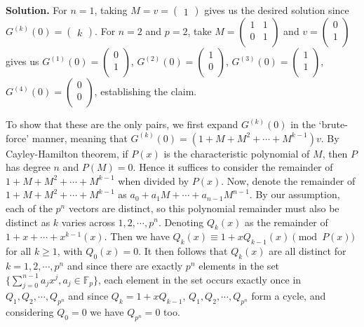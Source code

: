 \documentclass[11pt,a4paper]{article}
\newcommand{\bbF}{\mathbb F}
\newcommand{\<}{\langle}
\renewcommand{\>}{\rangle}
\begin{document}
\begin{enumerate}
	\textbf{Solution.} For $n=1$, taking $M=v=
	\begin{pmatrix}
	1
	\end{pmatrix}
	$ gives us the desired solution since $G^{(k)}(0)=
	\begin{pmatrix}
	k
	\end{pmatrix}
	$. For $n=2$ and $p=2$, take $M=
	\begin{pmatrix}
	1 & 1\\
	0 & 1\\
	\end{pmatrix}
	$ and $v=
	\begin{pmatrix}
	0\\
	1\\
	\end{pmatrix}
	$ gives us
	$G^{(1)}(0)=
	\begin{pmatrix}
	0\\
	1\\
	\end{pmatrix}
	$, 
	$G^{(2)}(0)=
	\begin{pmatrix}
	1\\
	0\\
	\end{pmatrix}
	$,
	$G^{(3)}(0)=
	\begin{pmatrix}
	1\\
	1\\
	\end{pmatrix}
	$,
	$G^{(4)}(0)=
	\begin{pmatrix}
	0\\
	0\\
	\end{pmatrix}
	$, establishing the claim. 
	
	To show that these are the only pairs, we first expand $G^{(k)}(0)$ in the `brute-force' manner, meaning that $G^{(k)}(0)=(1+M+M^2+\cdots + M^{k-1})v$. By Cayley-Hamilton theorem, if $P(x)$ is the characteristic polynomial of $M$, then $P$ has degree $n$ and $P(M)=0$. Hence it suffices to consider the remainder of $1+M+M^2+\cdots + M^{k-1}$ when divided by $P(x)$. Now, denote the remainder of $1+M+M^2+\cdots + M^{k-1}$ as $a_0+a_1M+\cdots + a_{n-1}M^{n-1}$. By our assumption, each of the $p^n$ vectors are distinct, so this polynomial remainder must also be distinct as $k$ varies across $1, 2, \cdots , p^n$. Denoting $Q_k(x)$ as the remainder of $1+x+\cdots + x^{k-1}(x)$. Then we have $Q_k(x)\equiv 1+xQ_{k-1}(x)\pmod{P(x)}$ for all $k\ge 1$, with $Q_0(x)=0$. It then follows that $Q_k(x)$ are all distinct for $k=1, 2, \cdots , p^n$ and since there are exactly $p^n$ elements in the set $\{\sum_{j=0}^{n-1}a_jx^j, a_j\in\bbF_p\}$, each element in the set occurs exactly once in $Q_1, Q_2, \cdots , Q_{p^n}$ and since $Q_k=1+xQ_{k-1}$, $Q_1, Q_2, \cdots , Q_{p^n}$ form a cycle, and considering $Q_0=0$ we have $Q_{p^n}=0$ too. 
	

\end{enumerate}
\end{document}
